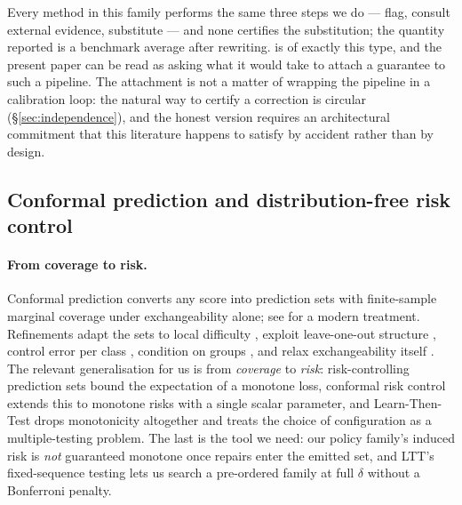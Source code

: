 \documentclass{article}
\theoremstyle{plain}
\theoremstyle{definition}
\theoremstyle{remark}
\begin{document}
Every method in this family performs the same three steps we do --- flag, consult external
evidence, substitute --- and none certifies the substitution; the quantity reported is a
benchmark average after rewriting. \citet{cmvkgguard} is of exactly this type, and the present
paper can be read as asking what it would take to attach a guarantee to such a pipeline. The
attachment is not a matter of wrapping the pipeline in a calibration loop: the natural way to
certify a correction is circular (\S\ref{sec:independence}), and the honest version requires
an architectural commitment that this literature happens to satisfy by accident rather than by
design.

\subsection{Conformal prediction and distribution-free risk control}
\label{sec:rel:conformal}

\paragraph{From coverage to risk.}
Conformal prediction \citep{vovk2005,papadopoulos2002,lei2018} converts any score into
prediction sets with finite-sample marginal coverage under exchangeability alone; see
\citet{angelopoulos2023gentle} for a modern treatment. Refinements adapt the sets to local
difficulty \citep{romano2019}, exploit leave-one-out structure \citep{barber2021}, control
error per class \citep{sadinle2019,ding2023}, condition on groups
\citep{vovk2003mondrian}, and relax exchangeability itself \citep{barber2023}. The relevant
generalisation for us is from \emph{coverage} to \emph{risk}: risk-controlling prediction sets
\citep{bates2021rcps} bound the expectation of a monotone loss, conformal risk control
\citep{angelopoulos2024crc} extends this to monotone risks with a single scalar parameter, and
Learn-Then-Test \citep{angelopoulos2021ltt} drops monotonicity altogether and treats the choice
of configuration as a multiple-testing problem. The last is the tool we need: our policy
family's induced risk is \emph{not} guaranteed monotone once repairs enter the emitted set,
and LTT's fixed-sequence testing lets us search a pre-ordered family at full $\delta$ without
a Bonferroni penalty.
\end{document}
